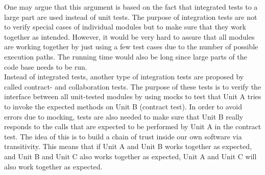 One may argue that this argument is based on the fact that integrated
tests to a large part are used instead of unit tests. The purpose of
integration tests are not to verify special cases of individual modules
but to make sure that they work together as intended. However, it would
be very hard to assure that all modules are working together by just
using a few test cases due to the number of possible execution paths.
The running time would also be long since large parts of the code base
needs to be run.\\

Instead of integrated tests, another type of integration tests are
proposed by \citeauthor{video:integrated_scam} called contract- and
collaboration tests. The purpose of these tests is to verify the
interface between all unit-tested modules by using mocks to test that
Unit A tries to invoke the expected methods on Unit B (contract test).
In order to avoid errors due to mocking, tests are also needed to make
sure that Unit B really responds to the calls that are expected to be
performed by Unit A in the contract test. The idea of this is to build a
chain of trust inside our own software via transitivity. This means that
if Unit A and Unit B works together as expected, and Unit B and Unit C
also works together as expected, Unit A and Unit C will also work
together as expected.\\
